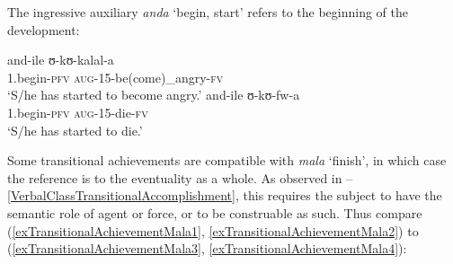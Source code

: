 The ingressive auxiliary \textit{anda} `begin, start' refers to the beginning of the development:
\begin{exe}
\ex \begin{xlist}
\ex \gll and-ile ʊ-kʊ-kalal-a\\
1.begin-\textsc{pfv} \textsc{aug}-15-be(come)\_angry-\textsc{fv}\\
\glt `S/he has started to become angry.'
\ex \gll and-ile ʊ-kʊ-fw-a\\
1.begin-\textsc{pfv} \textsc{aug}-15-die-\textsc{fv}\\
\glt `S/he has started to die.'
\end{xlist}
\end{exe}
Some transitional achievements are compatible with \textit{mala} \lq finish', in which case the reference is to the eventuality as a whole. As observed in --\ref{VerbalClassTransitionalAccomplishment}, this requires the subject to have the semantic role of agent or force, or to be construable as such. Thus compare (\ref{exTransitionalAchievementMala1}, \ref{exTransitionalAchievementMala2}) to (\ref{exTransitionalAchievementMala3}, \ref{exTransitionalAchievementMala4}):

\begin{exe}
\ex
\begin{xlist}


\end{xlist}
\end{exe}

